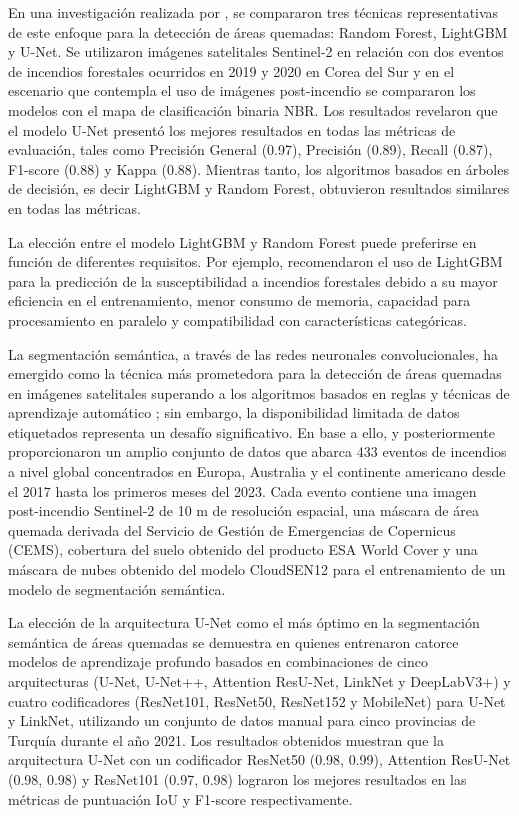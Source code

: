 En una investigación realizada por \citet{lee_machine_2022}, se compararon tres técnicas representativas de este enfoque para la detección de áreas quemadas:
Random Forest, LightGBM y U-Net. Se utilizaron imágenes satelitales Sentinel-2 en relación con dos eventos de incendios forestales ocurridos 
en 2019 y 2020 en Corea del Sur y en el escenario que contempla el uso de imágenes post-incendio se compararon los modelos con el mapa de clasificación 
binaria NBR. Los resultados revelaron que el modelo U-Net presentó los mejores resultados en todas las métricas de 
evaluación, tales como Precisión General (0.97), Precisión (0.89), Recall (0.87), F1-score (0.88) y Kappa (0.88). Mientras tanto, los algoritmos basados en árboles de 
decisión, es decir LightGBM y Random Forest, obtuvieron resultados similares en todas las métricas.

La elección entre el modelo LightGBM y Random Forest puede preferirse en función de diferentes requisitos. Por ejemplo, \citet{sun_forest_2022} 
recomendaron el uso de LightGBM para la predicción de la susceptibilidad a incendios forestales debido a su mayor eficiencia en el entrenamiento, menor consumo de memoria, capacidad para 
procesamiento en paralelo y compatibilidad con características categóricas. 

La segmentación semántica, a través de las redes neuronales convolucionales, ha emergido como la técnica más prometedora para la detección de áreas quemadas en imágenes satelitales superando
a los algoritmos basados en reglas \citep{cabuar_2023} y técnicas de aprendizaje automático \citep{tonbul_comparative_2023}; sin embargo, la disponibilidad limitada de datos etiquetados representa un desafío significativo. 
En base a ello, \citet{colomba_dataset_2022} y posteriormente \citet{arnaudo_robust_2023} proporcionaron un amplio conjunto de datos que abarca 433 eventos de incendios a nivel global concentrados en Europa, 
Australia y el continente americano desde el 2017 hasta los primeros meses del 2023. Cada evento contiene una imagen post-incendio Sentinel-2 de 10 m de resolución espacial,
una máscara de área quemada derivada del Servicio de Gestión de Emergencias de Copernicus (CEMS), cobertura del suelo obtenido del producto ESA World Cover y una máscara de nubes obtenido del modelo CloudSEN12 para el 
entrenamiento de un modelo de segmentación semántica.

La elección de la arquitectura U-Net como el más óptimo en la segmentación semántica de áreas quemadas se demuestra en \citet{al_dabbagh_2023} quienes entrenaron catorce modelos de aprendizaje 
profundo basados en combinaciones de cinco arquitecturas (U-Net, U-Net++, Attention ResU-Net, LinkNet y DeepLabV3+) y 
cuatro codificadores (ResNet101, ResNet50, ResNet152 y MobileNet) para U-Net y LinkNet, utilizando un conjunto de datos manual para cinco provincias 
de Turquía durante el año 2021. Los resultados obtenidos muestran que la arquitectura U-Net con un codificador ResNet50 (0.98, 
0.99), Attention ResU-Net (0.98, 0.98) y ResNet101 (0.97, 0.98) lograron los mejores resultados en las métricas de puntuación IoU y F1-score respectivamente.


